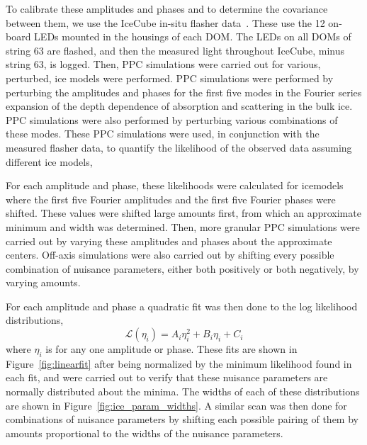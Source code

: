 \documentclass[main.tex]{subfiles}
\begin{document}
To calibrate these amplitudes and phases and to determine the covariance between them, we use the IceCube in-situ flasher data~\cite{Aartsen_2013}. 
These use the 12 on-board LEDs mounted in the housings of each DOM. 
The LEDs on all DOMs of string 63 are flashed, and then the measured light throughout IceCube, minus string 63, is logged. 
Then, PPC simulations were carried out for various, perturbed, ice models were performed. 
PPC simulations were performed by perturbing the amplitudes and phases for the first five modes in the Fourier series expansion of the depth dependence of absorption and scattering in the bulk ice.
PPC simulations were also performed by perturbing various combinations of these modes. 
These PPC simulations were used, in conjunction with the measured flasher data, to quantify the likelihood of the observed data assuming different ice models,

For each amplitude and phase, these likelihoods were calculated for icemodels where the first five Fourier amplitudes and the first five Fourier phases were shifted. 
These values were shifted large amounts first, from which an approximate minimum and width was determined. 
Then, more granular PPC simulations were carried out by varying these amplitudes and phases about the approximate centers. 
Off-axis simulations were also carried out by shifting every possible combination of nuisance parameters, either both positively or both negatively, by varying amounts. 


For each amplitude and phase a quadratic fit was then done to the log likelihood distributions, 
\begin{equation}
    \mathcal{L}(\eta_{i}) = A_{i}\eta_{i}^{2} + B_{i}\eta_{i} + C_{i}
\end{equation}
where $\eta_{i}$ is for any one amplitude or phase. These fits are shown in Figure~\ref{fig:linearfit} after being normalized by the minimum likelihood found in each fit, and were carried out to verify that these nuisance parameters are normally distributed about the minima.
The widths of each of these distributions are shown in Figure~\ref{fig:ice_param_widths}. 
A similar scan was then done for combinations of nuisance parameters by shifting each possible pairing of them by amounts proportional to the widths of the nuisance parameters. 
\end{document}
